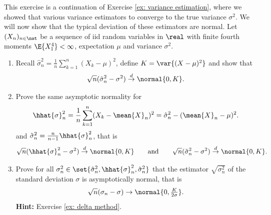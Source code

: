 \begin{exercise}
    This exercise is a continuation of Exercise \ref{ex: variance estimation},
    where we showed that various variance estimators to converge
    to the true variance \(\sigma^2\). We will now show that the typical
    deviation of these estimators are normal.
    Let \((X_n)_{n\in \nat}\) be a sequence of iid random variables in \(\real\)
    with finite fourth moments \(\E{X_1^4} < \infty\), expectation \(\mu\) and variance \(\sigma^2\).
    \begin{enumerate}[label=(\alph*), noitemsep]
        \item\label{it: (normality of variance estimation) theoretical estimator}
        Recall \(\hat\sigma_n^2 = \frac1n \sum_{k=1}^n (X_k - \mu)^2\), define \(K = \var{(X-\mu)^2}\) and show that
        \[
            \sqrt{n}(\hat\sigma_n^2 - \sigma^2) \overset{d}\to \normal{0, K}.
        \]

        \item\label{it: (normality of variance estimation) realistic estimator}
        Prove the same asymptotic normality for
        \[
            \hhat{\sigma}_n^2
            = \frac1n \sum_{k=1}^n (X_k - \mean{X}_n)^2
            = \hat\sigma_n^2 - (\mean{X}_n - \mu)^2.
        \]
        and \(\tilde \sigma_n^2 = \frac{n}{n-1} \hhat{\sigma}_n^2\),
        that is
        \[
            \sqrt{n}(\hhat{\sigma}_n^2 - \sigma^2) \overset{d}\to \normal{0, K}
            \qquad\text{and}\qquad
            \sqrt{n}(\tilde\sigma_n^2 - \sigma^2) \overset{d}\to \normal{0, K}.
        \]

        \item\label{it: (normality of variance estimation) standard deviation}
        Prove for all \(\sigma_n^2 \in \set{\hat\sigma_n^2, \hhat{\sigma}_n^2, \tilde\sigma_n^2}\) that
        the estimator \(\sqrt{\sigma_n^2}\) of the standard deviation \(\sigma\) is asymptotically normal, that
        is
        \[
            \sqrt{n}(\sigma_n - \sigma)
            \to \normal{0, \tfrac{K}{2\sigma}}.
        \]
        \textbf{Hint:} Exercise \ref{ex: delta method}.
    \end{enumerate}
\end{exercise}
